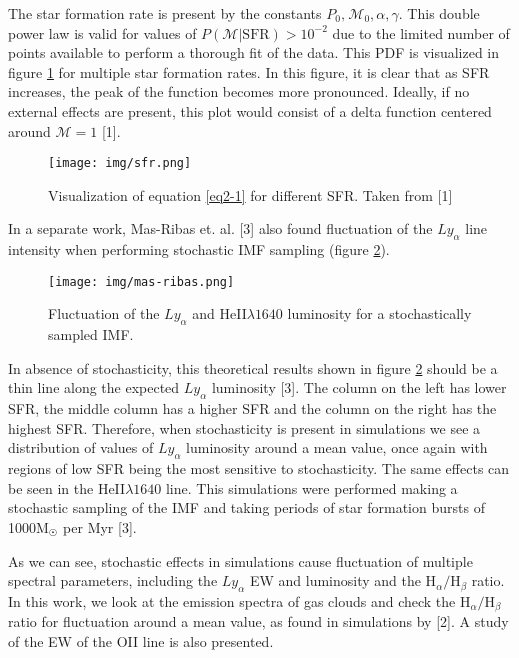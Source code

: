 The star formation rate is present by the constants $P_0,\hspace{1pt}\mathcal{M}_0, \alpha, \gamma$. This double power law
is valid for values of $P\left(\mathcal{M}|\mathrm{SFR}\right) > 10^{-2}$ due to the limited number of points available to perform
a thorough fit of the data. This PDF is visualized in figure \ref{fig2-1} for multiple star formation rates. In this figure, it is
clear that as SFR increases, the peak of the function becomes more pronounced. Ideally, if no external effects are
present, this plot would consist of a delta function centered around $\mathcal{M}=1$ [1].
\begin{figure}
  \centering
  \texttt{[image: img/sfr.png]}
  \label{fig2-1}
  \caption{Visualization of equation \ref{eq2-1} for different SFR. Taken from [1]}
\end{figure}

In a separate work, Mas-Ribas et. al. [3] also found fluctuation of the $Ly_{\alpha}$ line intensity when performing stochastic
IMF sampling (figure \ref{fig2-2}).
\begin{figure}
  \centering
  \texttt{[image: img/mas-ribas.png]}
  \caption{Fluctuation of the $Ly_{\alpha}$ and HeII$\lambda 1640$ luminosity for a stochastically sampled IMF.}
  \label{fig2-2}
\end{figure}
In absence of stochasticity, this theoretical results shown in figure \ref{fig2-2} should be a thin line along the expected
$Ly_{\alpha}$ luminosity [3]. The column on the left has lower SFR, the middle column has a higher SFR and the column on the right
has the highest SFR. Therefore, when stochasticity is present in simulations we see a distribution of values of $Ly_{\alpha}$
luminosity around a mean value, once again with regions of low SFR being the most sensitive to stochasticity. The same effects can
be seen in the HeII$\lambda 1640$ line. This simulations were performed making a stochastic sampling of the IMF and taking periods
of star formation bursts of 1000M$_{\astrosun}$ per Myr [3].

As we can see, stochastic effects in simulations cause fluctuation of multiple spectral parameters, including the $Ly_{\alpha}$
EW and luminosity and the H$_{\alpha}/$H$_{\beta}$ ratio. In this work, we look at the emission spectra of gas clouds and check the
H$_{\alpha}/$H$_{\beta}$ ratio for fluctuation around a mean value, as found in simulations by [2]. A study of the EW of the OII
line is also presented.

